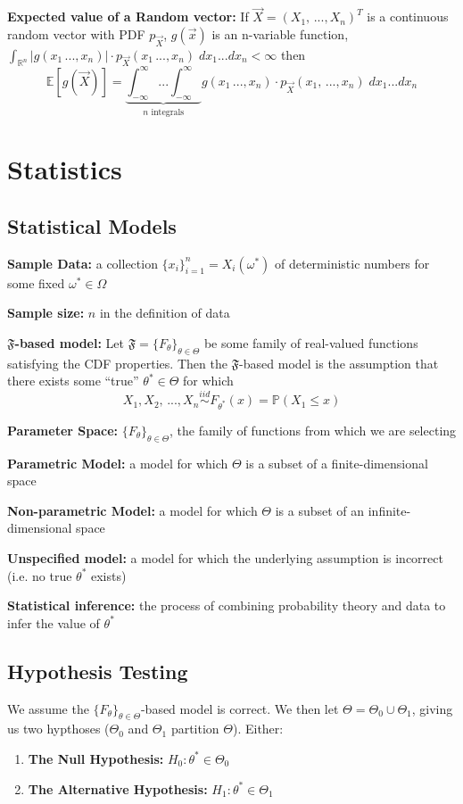 \documentclass[12pt]{article}
\renewcommand{\P}{\mathbb{P}}
\newcommand{\R}{\mathbb{R}}
\newcommand{\E}{\mathbb{E}}
\begin{document}
\textbf{Expected value of a Random vector:} If $\vec{X} = (X_1, \,..., X_n)^T$ is a continuous random vector with PDF $p_{\vec{X}}$, $g(\vec{x})$ is an n-variable function, $\int_{\R^n} |g(x_1\, ..., x_n)| \cdot p_{\vec{X}}(x_1\, ..., x_n) \; dx_1 ... dx_n <\infty$ then 
\[\E[g(\vec{X})] = \underbrace{\int_{-\infty}^{\infty} ... \int_{-\infty}^{\infty}}_{n \text{ integrals}} g(x_1\, ..., x_n) \cdot p_{\vec{X}}(x_1, \, ..., x_n) \; dx_1 ... dx_n\]

\section{Statistics}
\subsection{Statistical Models}
\textbf{Sample Data:} a collection $\{x_i\}_{i=1}^n = X_i(\omega^*)$ of deterministic numbers for some fixed $\omega^* \in \Omega$

\textbf{Sample size:} $n$ in the definition of data 

\textbf{$\mathfrak{F}$-based model:} Let $\mathfrak{F} = \{F_\theta\}_{\theta \in \Theta}$ be some family of real-valued functions satisfying the CDF properties. Then the $\mathfrak{F}$-based model is the assumption that there exists some ``true'' $\theta^* \in \Theta$ for which
\[X_1, X_2,\, ..., X_n \overset{iid}{\sim} F_{\theta^*}(x) = \P(X_1 \leq x)\]

\textbf{Parameter Space:} $\{F_\theta\}_{\theta \in \Theta}$, the family of functions from which we are selecting

\textbf{Parametric Model:} a model for which $\Theta$ is a subset of a finite-dimensional space

\textbf{Non-parametric Model:} a model for which $\Theta$ is a subset of an infinite-dimensional space

\textbf{Unspecified model:} a model for which the underlying assumption is incorrect (i.e. no true $\theta^*$ exists)

\textbf{Statistical inference:} the process of combining probability theory and data to infer the value of $\theta^*$

\subsection{Hypothesis Testing}
We assume the $\{F_\theta\}_{\theta \in \Theta}$-based model is correct. We then let $\Theta = \Theta_0 \cup \Theta_1$, giving us two hypthoses ($\Theta_0$ and $\Theta_1$ partition $\Theta$). Either:
\begin{enumerate}
    \item \textbf{The Null Hypothesis:} $H_0: \theta^* \in \Theta_0$ 
    \item \textbf{The Alternative Hypothesis:} $H_1: \theta^* \in \Theta_1$
\end{enumerate}
\end{document}
